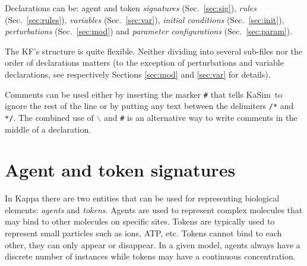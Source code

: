 \documentclass[11pt]{book}
\def\KaSim{\textsf{KaSim}}
\def\ttt#1{\texttt{#1}}
\def\bs{\backslash}
\def\imp#1{\emph{#1}\index{#1}}
\begin{document}
Declarations can be: agent and token \emph{signatures}
(Sec.~\ref{sec:sig}), \emph{rules} (Sec.~\ref{sec:rules}),
\emph{variables} (Sec.~\ref{sec:var}), \emph{initial
  conditions} (Sec.~\ref{sec:init}),
\emph{perturbations} (Sec.~\ref{sec:mod}) and
\emph{parameter configurations} (Sec.~\ref{sec:param}).

The KF's structure is quite flexible. Neither
dividing into several sub-files nor the order of
declarations matters (to the exception of
perturbations and variable declarations, see
respectively Sections \ref{sec:mod} and \ref{sec:var} for details).

Comments can be used either by inserting the marker
\ttt{\#} that tells \KaSim~to ignore the rest of the line or by
putting any text between the delimiters \ttt{/*} and \ttt{*/}. The
combined use of \ttt{$\bs$} and \ttt{\#} is an alternative way to
write comments in the middle of a declaration.

\section{Agent and token signatures}\label{sec:sig}
%
In Kappa there are two entities that can be used for representing
biological elements: \imp{agents} and \imp{tokens}.  Agents are used
to represent complex molecules that may bind to other molecules on
specific sites. Tokens are typically used to represent small particles
such as ions, ATP, etc. Tokens cannot bind to each other, they can
only appear or disappear. In a given model, agents always have a
discrete number of instances while tokens may have a continuous
concentration.
\end{document}
